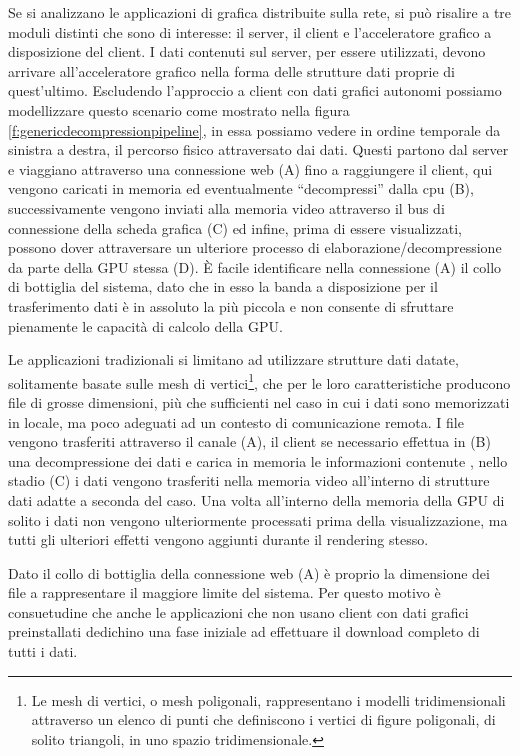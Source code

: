 Se si analizzano le applicazioni di grafica distribuite sulla rete, si pu\`o risalire a tre moduli distinti che sono di interesse: il server, il client e l'acceleratore grafico a disposizione del client. I dati contenuti sul server, per essere utilizzati, devono arrivare all'acceleratore grafico nella forma delle strutture dati proprie di quest'ultimo. Escludendo l'approccio a client con dati grafici autonomi possiamo modellizzare questo scenario come mostrato nella figura \ref{f:genericdecompressionpipeline}, in essa possiamo vedere in ordine temporale da sinistra a destra, il percorso fisico attraversato dai dati. Questi partono dal server e viaggiano attraverso una connessione web (A) fino a raggiungere il client, qui vengono caricati in memoria ed eventualmente ``decompressi'' dalla cpu (B), successivamente vengono inviati alla memoria video attraverso il bus di connessione della scheda grafica (C) ed infine, prima di essere visualizzati, possono dover attraversare un ulteriore processo di elaborazione/decompressione da parte della \ac{GPU} stessa (D). \`E facile identificare nella connessione (A) il collo di bottiglia del sistema, dato che in esso la banda a disposizione per il trasferimento dati \`e in assoluto la pi\`u piccola e non consente di sfruttare pienamente le capacit\`a di calcolo della \ac{GPU}.

Le applicazioni tradizionali si limitano ad utilizzare strutture dati datate, solitamente basate sulle mesh di vertici\footnote{Le mesh di vertici, o mesh poligonali, rappresentano i modelli tridimensionali attraverso un elenco di punti che definiscono i vertici di figure poligonali, di solito triangoli, in uno spazio tridimensionale.}, che per le loro caratteristiche producono file di grosse dimensioni, pi\`u che sufficienti nel caso in cui i dati sono memorizzati in locale, ma poco adeguati ad un contesto di comunicazione remota. I file vengono trasferiti attraverso il canale (A), il client se necessario effettua in (B) una decompressione dei dati e carica in memoria le informazioni contenute , nello stadio (C) i dati vengono trasferiti nella memoria video all'interno di strutture dati adatte a seconda del caso. Una volta all'interno della memoria della \ac{GPU} di solito i dati non vengono ulteriormente processati prima della visualizzazione, ma tutti gli ulteriori effetti vengono aggiunti durante il rendering stesso.

Dato il collo di bottiglia della connessione web (A) \`e proprio la dimensione dei file a rappresentare il maggiore limite del sistema. Per questo motivo \`e consuetudine che anche le applicazioni che non usano client con dati grafici preinstallati dedichino una fase iniziale ad effettuare il download completo di tutti i dati.

